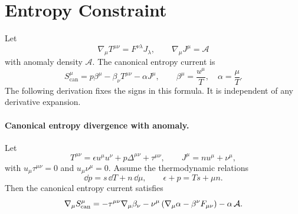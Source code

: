 \section{Entropy Constraint}

Let
\[
  \nabla_\mu T^{\mu\nu}=F^{\nu\lambda}J_\lambda,\qquad
  \nabla_\mu J^\mu=\mathcal A
\]
with anomaly density \(\mathcal A\).  The canonical entropy current is
\[
  S^\mu_{\mathrm{can}}
  =
  p\beta^\mu-\beta_\nu T^{\mu\nu}-\alpha J^\mu,
  \qquad
  \beta^\mu=\frac{u^\mu}{T},\quad \alpha=\frac{\mu}{T}.
\]
The following derivation fixes the signs in this formula.  It is independent
of any derivative expansion.

\paragraph{Canonical entropy divergence with anomaly.}
Let
\begin{equation}
  T^{\mu\nu}
  =
  \epsilon u^\mu u^\nu+p\Delta^{\mu\nu}+\tau^{\mu\nu},
  \qquad
  J^\mu=nu^\mu+\nu^\mu,
  \label{eq:anomalous-transport-dissipative-decomposition}
\end{equation}
with \(u_\mu\tau^{\mu\nu}=0\) and \(u_\mu\nu^\mu=0\).  Assume the
thermodynamic relations
\begin{equation}
  \dd p=s\,\dd T+n\,\dd\mu,\qquad
  \epsilon+p=Ts+\mu n.
  \label{eq:anomalous-transport-thermodynamics}
\end{equation}
Then the canonical entropy current satisfies
\begin{equation}
  \nabla_\mu S^\mu_{\rm can}
  =
  -\tau^{\mu\nu}\nabla_\mu\beta_\nu
  -\nu^\mu\left(\nabla_\mu\alpha-\beta^\nu F_{\mu\nu}\right)
  -\alpha\,\mathcal A .
  \label{eq:canonical-entropy-divergence-anomaly}
\end{equation}

